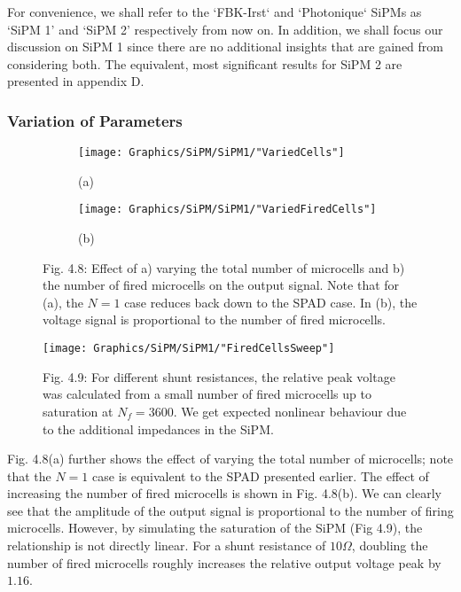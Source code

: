 For convenience, we shall refer to the `FBK-Irst` and `Photonique` SiPMs as `SiPM 1' and `SiPM 2' respectively from now on. In addition, we shall focus our discussion on SiPM 1 since there are no additional insights that are gained from considering both. The equivalent, most significant results for SiPM 2 are presented in appendix D.

\subsubsection{Variation of Parameters}

\begin{figure}[h]
  \centering
  \begin{subfigure}
    \centering
    \texttt{[image: Graphics/SiPM/SiPM1/"VariedCells"]}
    \caption*{(a)}
  \end{subfigure}
  \begin{subfigure}
    \centering
    \texttt{[image: Graphics/SiPM/SiPM1/"VariedFiredCells"]}
    \caption*{(b)}
  \end{subfigure}
  {\caption*{Fig. 4.8: Effect of a) varying the total number of microcells and b) the number of fired microcells on the output signal. Note that for (a), the $N=1$ case reduces back down to the SPAD case. In (b), the voltage signal is proportional to the number of fired microcells.}}
\end{figure}

\begin{figure}[h]
  \centering
  \texttt{[image: Graphics/SiPM/SiPM1/"FiredCellsSweep"]}
  {\caption*{Fig. 4.9: For different shunt resistances, the relative peak voltage was calculated from a small number of fired microcells up to saturation at $N_f=3600$. We get expected nonlinear behaviour due to the additional impedances in the SiPM.}}
\end{figure}

Fig. 4.8(a) further shows the effect of varying the total number of microcells; note that the $N=1$ case is equivalent to the SPAD presented earlier. The effect of increasing the number of fired microcells is shown in Fig. 4.8(b). We can clearly see that the amplitude of the output signal is proportional to the number of firing microcells. However, by simulating the saturation of the SiPM (Fig 4.9), the relationship is not directly linear. For a shunt resistance of $10\Omega$, doubling the number of fired microcells roughly increases the relative output voltage peak by $1.16$.


